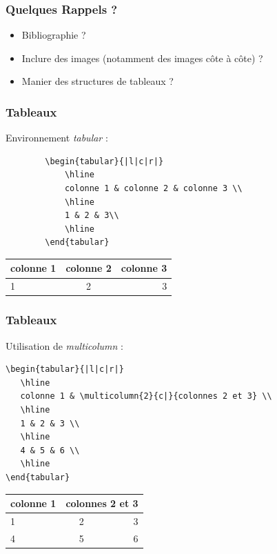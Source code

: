 \documentclass[handout]{beamer}
\begin{document}
	\begin{frame}
		\frametitle{Quelques Rappels ?}
		\begin{itemize}
			\item Bibliographie ?
			\item Inclure des images (notamment des images côte à côte) ?
			\item Manier des structures de tableaux ?
		\end{itemize}
	\end{frame}

\begin{frame}[fragile=singleslide]
	\frametitle{Tableaux}
	\centering
	Environnement \textit{tabular} :
	\begin{verbatim}
		\begin{tabular}{|l|c|r|}
			\hline
			colonne 1 & colonne 2 & colonne 3 \\
			\hline
			1 & 2 & 3\\
			\hline
		\end{tabular}
	\end{verbatim}

	\begin{tabular}{|l|c|r|}
		\hline
		colonne 1 & colonne 2 & colonne 3 \\
		\hline
		1 & 2 & 3\\
		\hline
	\end{tabular}

\end{frame}

\begin{frame}[fragile=singleslide]
	\frametitle{Tableaux}
	\centering
	Utilisation de \textit{multicolumn} :
	\begin{verbatim}
\begin{tabular}{|l|c|r|}
   \hline
   colonne 1 & \multicolumn{2}{c|}{colonnes 2 et 3} \\
   \hline
   1 & 2 & 3 \\
   \hline
   4 & 5 & 6 \\
   \hline
\end{tabular}
	\end{verbatim}

	\begin{tabular}{|l|c|r|}
	   \hline
	   colonne 1 & \multicolumn{2}{c|}{colonnes 2 et 3} \\
	   \hline
	   1 & 2 & 3 \\
	   \hline
	   4 & 5 & 6 \\
	   \hline
	\end{tabular}

\end{frame}
\end{document}
